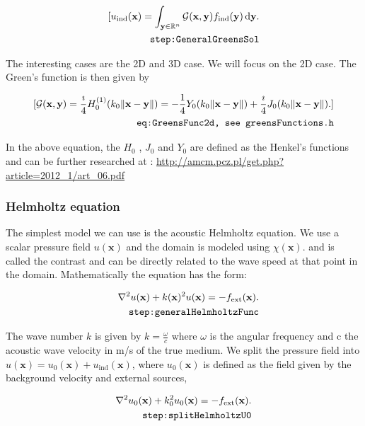 \documentclass[10pt,a4paper]{article}
\newcommand{\df}[1]{\, \ensuremath{\mbox{d}#1}}
\begin{document}
\begin{align} \label{eq:GeneralGreensSol}
[ u_\text{ind}(\mathbf{x}) =
\int_{\mathbf{y} \in \mathbb{R}^n} \mathcal{G}(\mathbf{x}, \mathbf{y})
f_\text{ind}(\mathbf{y}) \df{\mathbf{y}}.\\
\tag*{\texttt{step:GeneralGreensSol}}
\end{align}

The interesting cases are the 2D and 3D case. We will focus on the 2D case. The Green's function is then
given by

\begin{align} \label{eq:GreensFunc2d}[ \mathcal{G}(\mathbf{x}, \mathbf{y}) =
\frac{\imath}{4} H_0^{(1)}(k_0 \|\mathbf{x} - \mathbf{y}\|) =
-\frac{1}{4} Y_0(k_0 \|\mathbf{x} - \mathbf{y}\|) + \frac{\imath}{4}
J_0(k_0 \|\mathbf{x} - \mathbf{y}\|).  ]\\
\tag*{\texttt{eq:GreensFunc2d, see greensFunctions.h}}
\end{align}

In the above equation, the $H_0$ , $J_0$ and $Y_0$ are defined as the
Henkel's functions and can be further researched at :
\url{http://amcm.pcz.pl/get.php?article=2012_1/art_06.pdf}

\subsubsection{Helmholtz equation}
The simplest model we can use is the acoustic Helmholtz equation. We
use a scalar pressure field $u(\mathbf{x})$ and the domain is modeled
using $\chi(\mathbf{x})$. and is called the contrast and can be
directly related to the wave speed at that point in the domain.
Mathematically the equation has the form:

\begin{align} \label{eq:generalHelmholtzFunc}
\nabla^2 u(\mathbf{x}) + k(\mathbf{x})^2 u(\mathbf{x}) =
-f_{\text{ext}}(\mathbf{x}).\\
\tag*{\texttt{step:generalHelmholtzFunc}}
\end{align}

The wave number $k$ is given by $k = \frac{\omega}{c}$ where $\omega$
is the angular frequency and c the
acoustic wave velocity in m/s of the true medium.
We split the pressure field into $u(\mathbf{x}) = u_0(\mathbf{x}) +
u_{\text{ind}}(\mathbf{x})$, where $u_0(\mathbf{x})$ is defined as the
field given by the background velocity and external sources,

\begin{align} \label{eq:splitHelmholtzU0}
\nabla^2 u_0(\mathbf{x}) + k_0^2 u_0(\mathbf{x}) = -f_{\text{ext}}(\mathbf{x}).\\
\tag*{\texttt{step:splitHelmholtzU0}}
\end{align}
\end{document}
